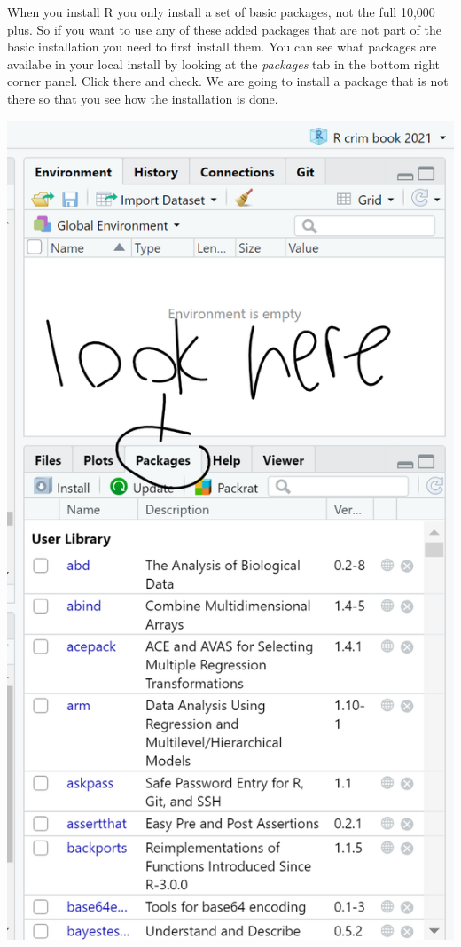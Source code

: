 \documentclass[]{book}
\begin{document}
When you install R you only install a set of basic packages, not the full 10,000 plus. So if you want to use any of these added packages that are not part of the basic installation you need to first install them. You can see what packages are availabe in your local install by looking at the \emph{packages} tab in the bottom right corner panel. Click there and check. We are going to install a package that is not there so that you see how the installation is done.

\includegraphics{img/packages.png}
\end{document}

